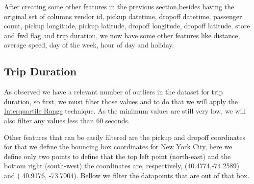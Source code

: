 \documentclass[11pt]{article}
\begin{document}
After creating some other features in the previous section,besides having the original set of columns vendor id, pickup datetime, dropoff datetime, passenger count, pickup longitude, pickup latitude, dropoff longitude, dropoff latitude, store and fwd flag and trip duration, we now have some other features like distance, average speed, day of the week, hour of day and holiday.

\subsection{Trip Duration}

\hspace{0.5cm}As observed we have a relevant number of outliers in the dataset for trip duration, so first, we must filter those values and to do that we will apply the
\href{https://en.wikipedia.org/wiki/Interquartile_range}{Interquartile Range} technique. As the minimum values are still very low, we will also filter any values less than 60 seconds.


Other features that can be easily filtered are the pickup and dropoff coordinates for that we define the bouncing box coordinates for New York City, here we define only two points to define that the top left point (north-east) and the bottom right (south-west) the coordinates are, respectively, (40.4774,-74.2589) and ( 40.9176, -73.7004). Bellow we filter the datapoints that are out of that box.
\end{document}
